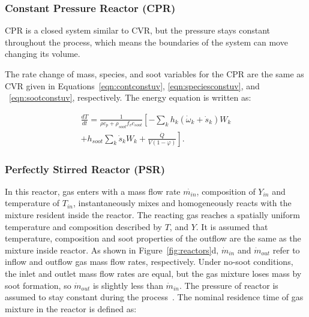 \subsubsection{Constant Pressure Reactor (CPR)}

CPR is a closed system similar to CVR, but the pressure stays constant throughout the process, which means the boundaries of the system can move changing its volume. %



The rate change of mass, species, and soot variables for the CPR are the same as CVR given in Equations~\eqref{eqn:contconstuv}, \eqref{eqn:speciesconstuv}, and ~\eqref{eqn:sootconstuv}, respectively. The energy equation is written as:

\begin{equation}
	\begin{split}
		\frac{d T}{d t}=
		\frac{1}{\rho c_p+\rho_{soot}f_v c_{soot}}
		\left[
		-\sum_k h_k
		\left(
		\dot{\omega}_k+\dot{s}_k
		\right) W_k \right. \\
		\left.
		+h_{soot}\sum_k \dot{s}_k W_k
		+\frac{\dot{Q}}{V(1-\varphi)}
		\right]
		\label{eqn:energypressure}.
	\end{split}
\end{equation}

\subsubsection{Perfectly Stirred Reactor (PSR)}
In this reactor, gas enters with a mass flow rate $\dot{m_{in}}$, composition of $Y_{in}$ and temperature of $T_{in}$, instantaneously mixes and homogeneously reacts with the mixture resident inside the reactor. The reacting gas reaches a spatially uniform temperature and composition described by $T$, and $Y$. It is assumed that temperature, composition and soot properties of the outflow are the same as the mixture inside reactor. As shown in Figure~\ref{fig:reactors}d, ${\dot{m}_{in}}$ and ${\dot{m}_{out}}$ refer to inflow and outflow gas mass flow rates, respectively. Under no-soot conditions, the inlet and outlet mass flow rates are equal, but the gas mixture loses mass by soot formation, so ${\dot{m}_{out}}$ is slightly less than ${\dot{m}_{in}}$. The pressure of reactor is assumed to stay constant during the process~\citep{kee2017chemically}. The nominal residence time of gas mixture in the reactor is defined as:

